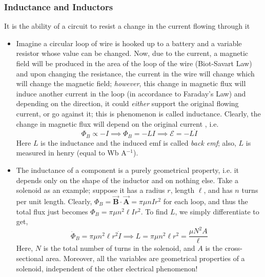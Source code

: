 \documentclass{scrartcl}
\begin{document}
    \subsubsection{Inductance and Inductors}\newline
    It is the ability of a circuit to resist a change in the current flowing through it
    \begin{itemize}
        \item Imagine a circular loop of wire is hooked up to a battery and a variable resistor whose value can be changed. Now, due to the current, a magnetic field will be produced in the area of the loop of the wire (Biot-Savart Law) and upon changing the resistance, the current in the wire will change which will change the magnetic field; \textit{however}, this change in magnetic flux will induce another current in the loop (in accordance to Faraday's Law) and depending on the direction, it could \textit{either} support the original flowing current, or go against it; this is phenomenon is called inductance. Clearly, the change in magnetic flux will depend on the original current , i.e. \[\Phi_B\propto-I\implies\Phi_B=-LI\implies\boxed{\mathcal E=-L\dot I}\] Here $L$ is the inductance and the induced emf is called \textit{back emf}; also, $L$ is measured in henry (equal to Wb A$^{-1}$).
        \item The inductance of a component is a purely geometrical property, i.e. it depends only on the shape of the inductor and on nothing else. Take a solenoid as an example; suppose it has a radius $r$, length $\ell$, and has $n$ turns per unit length. Clearly, $\Phi_B=\vec{\mathbf B}\cdot\vec{\mathbf A}=\pi\mu nIr^2$ for each loop, and thus the total flux just becomes $\Phi_B=\pi\mu n^2\ell Ir^2$. To find $L$, we simply differentiate to get, \[\dot\Phi_B=\pi\mu n^2\ell r^2\dot I\implies\boxed{L=\pi\mu n^2\ell r^2=\frac{\mu N^2A}\ell}\] Here, $N$ is the total number of turns in the solenoid, and $A$ is the cross-sectional area. Moreover, all the variables are geometrical properties of a solenoid, independent of the other electrical phenomenon!
    \end{itemize}
\end{document}
